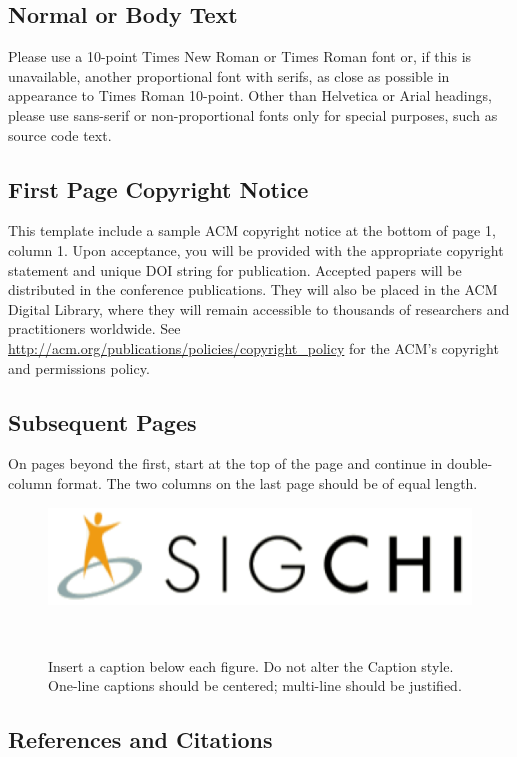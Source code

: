 \documentclass{sigchi}
\begin{document}
\subsection{Normal or Body Text}

Please use a 10-point Times New Roman or Times Roman font or, if this
is unavailable, another proportional font with serifs, as close as
possible in appearance to Times Roman 10-point. Other than Helvetica
or Arial headings, please use sans-serif or non-proportional fonts
only for special purposes, such as source code text.

\subsection{First Page Copyright Notice}
This template include a sample ACM copyright notice at the bottom of
page 1, column 1.  Upon acceptance, you will be provided with the
appropriate copyright statement and unique DOI string for publication.
Accepted papers will be distributed in the conference
publications. They will also be placed in the ACM Digital Library,
where they will remain accessible to thousands of researchers and
practitioners worldwide. See
\url{http://acm.org/publications/policies/copyright_policy} for the
ACM's copyright and permissions policy.

\subsection{Subsequent Pages}

On pages beyond the first, start at the top of the page and continue
in double-column format.  The two columns on the last page should be
of equal length.

\begin{figure}
\centering
  \includegraphics[width=0.9\columnwidth]{figures/sigchi-logo}
  \caption{Insert a caption below each figure. Do not alter the
    Caption style.  One-line captions should be centered; multi-line
    should be justified. }~\label{fig:figure1}
\end{figure}

\subsection{References and Citations}
\end{document}

